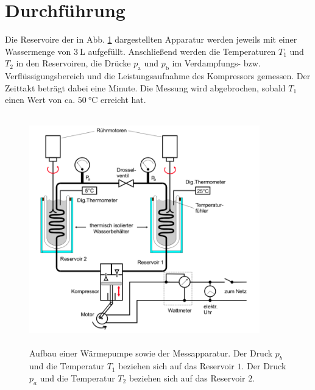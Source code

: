 \section{Durchführung}
\label{sec:Durchführung}

Die Reservoire der in Abb. \ref{fig:aufbau2} dargestellten Apparatur werden jeweils mit einer Wassermenge von 
$\SI{3}{\liter}$ aufgefüllt. Anschließend werden die Temperaturen $T_1$ und $T_\text{2}$ in den 
Reservoiren, die Drücke $p_\text{a}$ und $p_\text{b}$ im Verdampfungs- bzw. Verflüssigungsbereich und 
die Leistungsaufnahme des Kompressors gemessen. Der Zeittakt beträgt dabei eine Minute. 
Die Messung wird abgebrochen, sobald $T_1$ einen Wert von ca. $\SI{50}{\degreeCelsius}$ 
erreicht hat. 
\begin{figure}
    \centering
    \includegraphics[width=10cm, height=10cm]{build/2.png}
    \caption{Aufbau einer Wärmepumpe sowie der Messapparatur.
    Der Druck $p_b$ und die Temperatur
    $T_1$ beziehen sich auf das Reservoir $\num{1}$. Der Druck $p_a$ und die Temperatur
$T_2$ beziehen sich auf das Reservoir $\num{2}$. \cite{V206}}
    \label{fig:aufbau2}
\end{figure}
